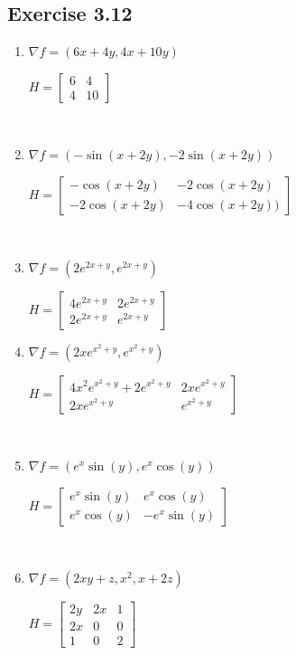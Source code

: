 \subsection*{Exercise 3.12}

\begin{minipage}[t]{0.5\linewidth}    
    \begin{enumerate} 
        \item $\nabla f = (6x + 4y, 4x + 10y)$

        $H = \begin{bmatrix} 6 & 4 \\ 4 & 10 \end{bmatrix}$

        {~~~}

        \item $\nabla f = (-\sin(x + 2y), -2\sin(x + 2y))$

        $H = \begin{bmatrix} -\cos(x + 2y) & -2\cos(x + 2y) \\ -2\cos(x + 2y) & -4\cos(x + 2y)) \end{bmatrix}$

        {~~~}

        \item $\nabla f = (2e^{2x+y}, e^{2x+y})$

        $H = \begin{bmatrix} 4e^{2x+y} & 2e^{2x+y} \\ 2e^{2x+y} & e^{2x+y} \end{bmatrix}$
    \end{enumerate}
\end{minipage}
\begin{minipage}[t]{0.45\linewidth}    
    \begin{enumerate} \setcounter{enumi}{3} 
        \item $\nabla f = (2xe^{x^2+y}, e^{x^2+y})$

        $H = \begin{bmatrix} 4x^2e^{x^2+y} + 2e^{x^2+y} & 2xe^{x^2+y} \\ 2xe^{x^2+y} & e^{x^2+y} \end{bmatrix}$

        {~~~}

        \item $\nabla f = (e^x\sin(y), e^x\cos(y))$

        $H = \begin{bmatrix} e^x\sin(y) & e^x\cos(y) \\ e^x\cos(y) & -e^x\sin(y) \end{bmatrix}$

        {~~~}

        \item $\nabla f = (2xy + z, x^2, x + 2z)$

        $H = \begin{bmatrix} 2y & 2x & 1 \\ 2x & 0 & 0 \\ 1 & 0 & 2 \end{bmatrix}$
    \end{enumerate}
\end{minipage}

